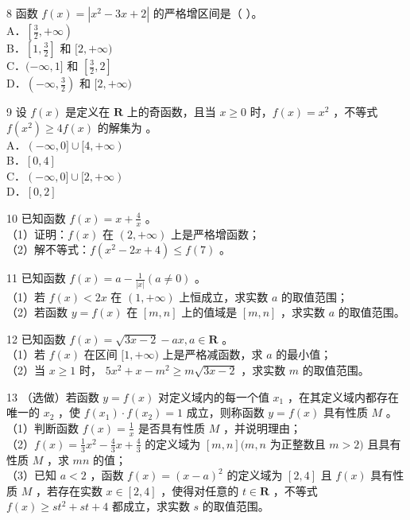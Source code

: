 \documentclass[10pt]{article}
\begin{document}
8 函数 \(f(x)=\left|x^{2}-3 x+2\right|\) 的严格增区间是（ ）。\\
A．\(\left[\frac{3}{2},+\infty\right)\)\\
B．\(\left[1, \frac{3}{2}\right]\) 和 \([2,+\infty)\)\\
C．\((-\infty, 1]\) 和 \(\left[\frac{3}{2}, 2\right]\)\\
D．\(\left(-\infty, \frac{3}{2}\right)\) 和 \([2,+\infty)\)

9 设 \(f(x)\) 是定义在 \(\mathbf{R}\) 上的奇函数，且当 \(x \geqslant 0\) 时，\(f(x)=x^{2}\) ，不等式 \(f\left(x^{2}\right) \geqslant 4 f(x)\) 的解集为 。\\
A．\((-\infty, 0] \cup[4,+\infty)\)\\
B．\([0,4]\)\\
C．\((-\infty, 0] \cup[2,+\infty)\)\\
D．\([0,2]\)

10 已知函数 \(f(x)=x+\frac{4}{x}\) 。\\
（1）证明：\(f(x)\) 在 \((2,+\infty)\) 上是严格增函数；\\
（2）解不等式：\(f\left(x^{2}-2 x+4\right) \leqslant f(7)\) 。

11 已知函数 \(f(x)=a-\frac{1}{|x|}(a \neq 0)\) 。\\
（1）若 \(f(x)<2 x\) 在 \((1,+\infty)\) 上恒成立，求实数 \(a\) 的取值范围；\\
（2）若函数 \(y=f(x)\) 在 \([m, n]\) 上的值域是 \([m, n]\) ，求实数 \(a\) 的取值范围。

12 已知函数 \(f(x)=\sqrt{3 x-2}-a x, a \in \mathbf{R}\) 。\\
（1）若 \(f(x)\) 在区间 \([1,+\infty)\) 上是严格减函数，求 \(a\) 的最小值；\\
（2）当 \(x \geqslant 1\) 时， \(5 x^{2}+x-m^{2} \geqslant m \sqrt{3 x-2}\) ，求实数 \(m\) 的取值范围。

13 （选做）若函数 \(y=f(x)\) 对定义域内的每一个值 \(x_{1}\) ，在其定义域内都存在唯一的 \(x_{2}\) ，使 \(f\left(x_{1}\right) \cdot f\left(x_{2}\right)=1\) 成立，则称函数 \(y=f(x)\) 具有性质 \(M\) 。\\
（1）判断函数 \(f(x)=\frac{1}{x}\) 是否具有性质 \(M\) ，并说明理由；\\
（2）\(f(x)=\frac{1}{3} x^{2}-\frac{4}{3} x+\frac{4}{3}\) 的定义域为 \([m, n](m, n\) 为正整数且 \(m>2)\) 且具有性质 \(M\) ，求 \(m n\) 的值；\\
（3）已知 \(a<2\) ，函数 \(f(x)=(x-a)^{2}\) 的定义域为 \([2,4]\) 且 \(f(x)\) 具有性质 \(M\) ，若存在实数 \(x \in[2,4]\) ，使得对任意的 \(t \in \mathbf{R}\) ，不等式 \(f(x) \geqslant s t^{2}+s t+4\) 都成立，求实数 \(s\) 的取值范围。
\end{document}
